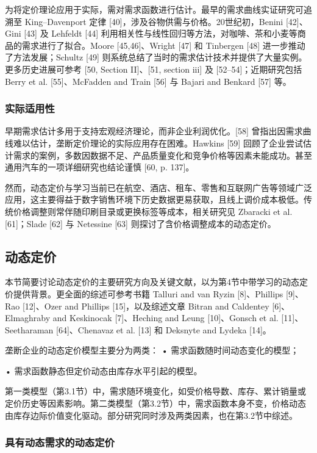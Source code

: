 为将定价理论应用于实际，需对需求函数进行估计。最早的需求曲线实证研究可追溯至 King–Davenport 定律 [40]，涉及谷物供需与价格。20世纪初，Benini [42]、Gini [43] 及 Lehfeldt [44] 利用相关性与线性回归等方法，对咖啡、茶和小麦等商品的需求进行了拟合。Moore [45,46]、Wright [47] 和 Tinbergen [48] 进一步推动了方法发展；Schultz [49] 则系统总结了当时的需求估计技术并提供了大量实例。更多历史进展可参考 [50, Section II]、[51, section iii] 及 [52–54]；近期研究包括 Berry et al. [55]、McFadden and Train [56] 与 Bajari and Benkard [57] 等。

\subsubsection{实际适用性}\label{practical-applicability}

早期需求估计多用于支持宏观经济理论，而非企业利润优化。[58] 曾指出因需求曲线难以估计，垄断定价理论的实际应用存在困难。Hawkins [59] 回顾了企业尝试估计需求的案例，多数因数据不足、产品质量变化和竞争价格等因素未能成功。甚至通用汽车的一项详细研究也结论谨慎 [60, p. 137]。

然而，动态定价与学习当前已在航空、酒店、租车、零售和互联网广告等领域广泛应用，这主要得益于数字销售环境下历史数据更易获取，且线上调价成本极低。传统价格调整则常伴随印刷目录或更换标签等成本，相关研究见 Zbaracki et al. [61]；Slade [62] 与 Netessine [63] 则探讨了含价格调整成本的动态定价。


\subsection{动态定价}\label{dynamic-pricing}

本节简要讨论动态定价的主要研究方向及关键文献，以为第4节中带学习的动态定价提供背景。更全面的综述可参考书籍 Talluri and van Ryzin [8]、Phillips [9]、Rao [12]、Ozer and Phillips [15]，以及综述文章 Bitran and Caldentey [6]、Elmaghraby and Keskinocak [7]、Heching and Leung [10]、Gonsch et al. [11]、Seetharaman [64]、Chenavaz et al. [13] 和 Deksnyte and Lydeka [14]。

垄断企业的动态定价模型主要分为两类：
• 需求函数随时间动态变化的模型；

• 需求函数静态但定价动态由库存水平引起的模型。

第一类模型（第3.1节）中，需求随环境变化，如受价格导数、库存、累计销量或定价历史等因素影响。第二类模型（第3.2节）中，需求函数本身不变，价格动态由库存边际价值变化驱动。部分研究同时涉及两类因素，也在第3.2节中综述。

\subsubsection{具有动态需求的动态定价}\label{dynamic-pricing-with-dynamic-demand}

